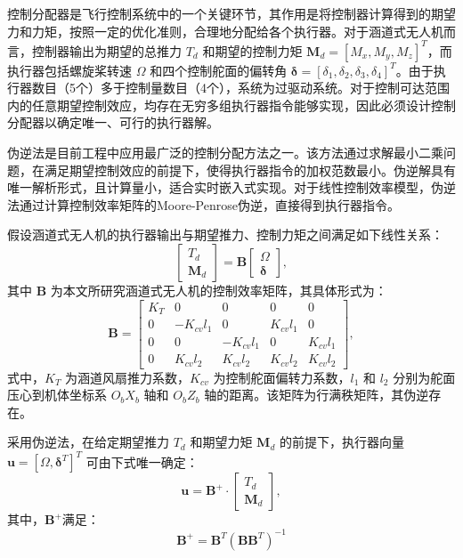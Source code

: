 控制分配器是飞行控制系统中的一个关键环节，其作用是将控制器计算得到的期望力和力矩，按照一定的优化准则，合理地分配给各个执行器。对于涵道式无人机而言，控制器输出为期望的总推力 \(T_d\) 和期望的控制力矩 \(\boldsymbol{M}_d = [M_x, M_y, M_z]^T\)，而执行器包括螺旋桨转速 \(\Omega\) 和四个控制舵面的偏转角 \(\boldsymbol{\delta} = [\delta_1, \delta_2, \delta_3, \delta_4]^T\)。由于执行器数目（5个）多于控制量数目（4个），系统为过驱动系统。对于控制可达范围内的任意期望控制效应，均存在无穷多组执行器指令能够实现，因此必须设计控制分配器以确定唯一、可行的执行器解。

伪逆法是目前工程中应用最广泛的控制分配方法之一。该方法通过求解最小二乘问题，在满足期望控制效应的前提下，使得执行器指令的加权范数最小。伪逆解具有唯一解析形式，且计算量小，适合实时嵌入式实现。对于线性控制效率模型，伪逆法通过计算控制效率矩阵的Moore-Penrose伪逆，直接得到执行器指令。

假设涵道式无人机的执行器输出与期望推力、控制力矩之间满足如下线性关系：
\begin{equation}
    \begin{bmatrix}
        T_d \\
        \boldsymbol{M}_d
    \end{bmatrix} = \boldsymbol{B}
    \begin{bmatrix}
        \Omega \\
        \boldsymbol{\delta}
    \end{bmatrix},
\end{equation}
其中 \(\boldsymbol{B}\) 为本文所研究涵道式无人机的控制效率矩阵，其具体形式为：
\begin{equation}
    \boldsymbol{B} = 
    \begin{bmatrix}
        K_T & 0 & 0 & 0 & 0 \\
        0 & -K_{cv} l_1 & 0 & K_{cv} l_1 & 0 \\
        0 & 0 & -K_{cv} l_1 & 0 & K_{cv} l_1 \\
        0 & K_{cv} l_2 & K_{cv} l_2 & K_{cv} l_2 & K_{cv} l_2
    \end{bmatrix},
\end{equation}
式中，\(K_T\) 为涵道风扇推力系数，\(K_{cv}\) 为控制舵面偏转力系数，\(l_1\) 和 \(l_2\) 分别为舵面压心到机体坐标系 \(O_bX_b\) 轴和 \(O_bZ_b\) 轴的距离。该矩阵为行满秩矩阵，其伪逆存在。

采用伪逆法，在给定期望推力 \(T_d\) 和期望力矩 \(\boldsymbol{M}_d\) 的前提下，执行器向量 \(\boldsymbol{u} = [\Omega, \boldsymbol{\delta}^T]^T\) 可由下式唯一确定：
\begin{equation}
    \boldsymbol{u} = \boldsymbol{B}^+ \cdot \begin{bmatrix}
        T_d \\
        \boldsymbol{M}_d
    \end{bmatrix},
\end{equation}
其中，\(\boldsymbol{B}^+\)满足：
\begin{equation}
    \boldsymbol{B}^+ = \boldsymbol{B}^T(\boldsymbol{B}\boldsymbol{B}^T)^{-1}
    \label{eq:B_matrix}
\end{equation}

